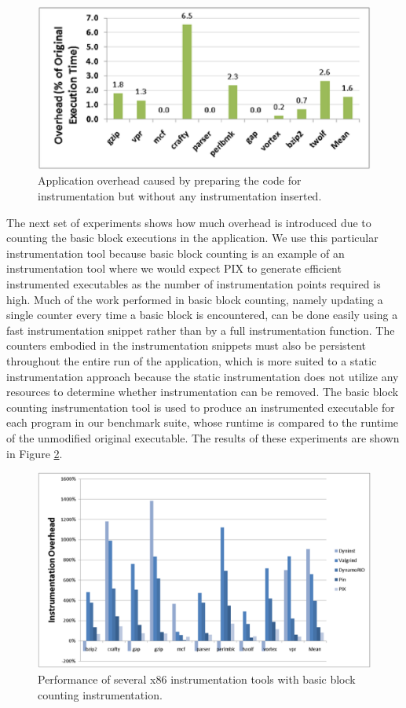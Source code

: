 \begin{figure}[ht]
\centering
\label{fig:RelocOverhead}
\includegraphics[scale=0.6]{relocperf.eps}
\caption{Application overhead caused by preparing the code for instrumentation but without
any instrumentation inserted.}
\end{figure}

The next set of experiments shows how much overhead is introduced due to counting the
basic block executions in the application. We use this particular instrumentation tool because basic block counting
is an example of an instrumentation tool where we would expect PIX to generate efficient instrumented executables
as the number of instrumentation points required is high. Much of the work performed in basic block counting, namely updating a single
counter every time a basic block is encountered, can be done easily using a fast instrumentation snippet rather than
by a full instrumentation function. The counters embodied in the instrumentation snippets must also be
persistent throughout the entire run of the application, which is more suited to a static instrumentation approach
because the static instrumentation does not utilize any resources to determine whether instrumentation can be removed.
The basic block counting instrumentation tool is used to produce an instrumented
executable for each program in our benchmark suite, whose runtime is compared to the runtime of the 
unmodified original executable. The results of these experiments are shown in Figure \ref{fig:ToolOverheads}. 

\begin{figure}[ht]
\centering
\label{fig:ToolOverheads}
\includegraphics[scale=0.32]{bbcount.eps}
\caption{Performance of several x86 instrumentation tools with basic block counting instrumentation.}
\end{figure}

